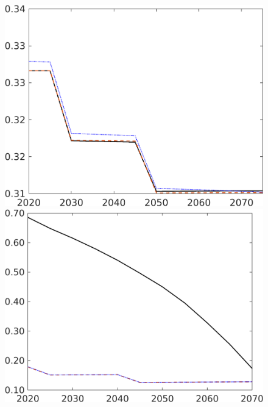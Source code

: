 \begin{figure}[h!!]
\begin{minipage}[]{0.32\textwidth}
	\end{minipage}
	\begin{minipage}[]{0.32\textwidth}
		\includegraphics[width=1\textwidth]{../../codding_model/own_basedOnFried/optimalPol_190722_tidiedUp/figures/all_July22/hl_DDCompEffOPT_T_NoTaus_pol4_spillover0_noskill0_sep1_xgrowth0_etaa0.79_lgd0_lff0.png}
	\end{minipage}
	\begin{minipage}[]{0.32\textwidth}
		\includegraphics[width=1\textwidth]{../../codding_model/own_basedOnFried/optimalPol_190722_tidiedUp/figures/all_July22/gAagg_DDCompEffOPT_T_NoTaus_pol4_spillover0_noskill0_sep1_xgrowth0_etaa0.79_lgd0_lff0.png}

\end{minipage}
\end{figure}
